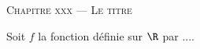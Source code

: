 \documentclass[a4paper]{article}
\begin{document}
\begin{center}
  {\scshape\LARGE Chapitre xxx --- Le titre\par}
\end{center}
 
\begin{activite}{}{} 

\end{activite}


\begin{definition}{}{}
    Soit $f$ la fonction définie sur $\R$ par ....
\end{definition}

\begin{propriete}{}{}  
\end{propriete}

\begin{exercices}{}{}
\end{exercices}


  
\end{document}
